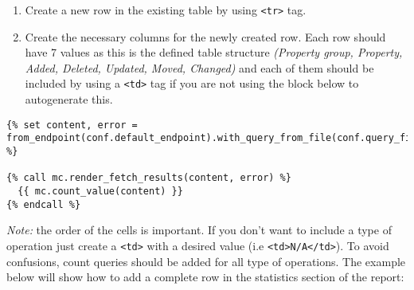 \begin{enumerate}
  \item Create a new row in the existing table by using \texttt{<tr>} tag.
  \item Create the necessary columns for the newly created row. Each row should have 7 values as this is the defined table structure \textit{(Property group, Property, Added, Deleted, Updated, Moved, Changed)} and each of them should be included by using a \texttt{<td>} tag if you are not using the block below to autogenerate this.
\end{enumerate}

\begin{lstlisting}
{% set content, error = from_endpoint(conf.default_endpoint).with_query_from_file(conf.query_files["new_count_query_file_name.rq"]).fetch_tabular() %}
  
{% call mc.render_fetch_results(content, error) %}
  {{ mc.count_value(content) }}
{% endcall %}
\end{lstlisting}

\textit{Note:} the order of the cells is important. If you don't want to include a type of operation just create a \texttt{<td>} with a desired value (i.e \texttt{<td>N/A</td>}). To avoid confusions, count queries should be added for all type of operations. The example below will show how to add a complete row in the statistics section of the report:

